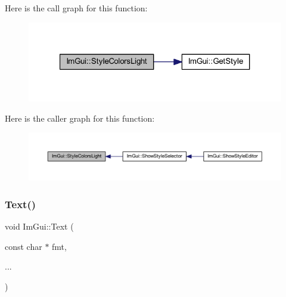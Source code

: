 Here is the call graph for this function\+:
\nopagebreak
\begin{figure}[H]
\begin{center}
\leavevmode
\includegraphics[width=321pt]{namespace_im_gui_ae1fc558bfbc557b228d63f7facfc86e1_cgraph}
\end{center}
\end{figure}
Here is the caller graph for this function\+:
\nopagebreak
\begin{figure}[H]
\begin{center}
\leavevmode
\includegraphics[width=350pt]{namespace_im_gui_ae1fc558bfbc557b228d63f7facfc86e1_icgraph}
\end{center}
\end{figure}
\mbox{\label{namespace_im_gui_a9e7b83611fe441d54fad2effb4bf4965}} 
\subsubsection{\texorpdfstring{Text()}{Text()}}
{\footnotesize\ttfamily void Im\+Gui\+::\+Text (\begin{DoxyParamCaption}\item[{const char $\ast$}]{fmt,  }\item[{}]{... }\end{DoxyParamCaption})}

